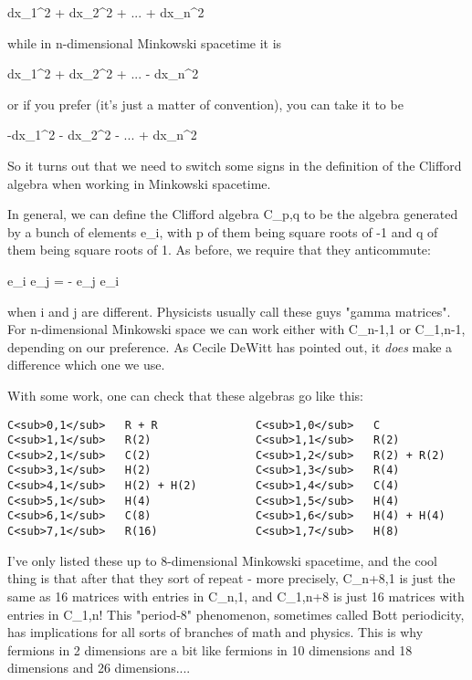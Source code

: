                         dx_{1}^{2} + dx_{2}^{2} + ... + dx_{n}^{2}  

while in n-dimensional Minkowski spacetime it is

                        dx_{1}^{2} + dx_{2}^{2} 
+ ... - dx_{n}^{2}   
 
or if you prefer (it's just a matter of convention), you can
take it to be

                       -dx_{1}^{2} - dx_{2}^{2} 
- ... + dx_{n}^{2}   


So it turns out that we need to switch some signs in the definition 
of the Clifford algebra when working in Minkowski spacetime.  

In general, we can define the Clifford algebra C_{p,q} to be the 
algebra generated by a bunch of elements e_{i}, with p of them 
being square roots 
of -1 and q of them being square roots of 1.  As before, we require that 
they anticommute:

e_{i} e_{j} = - e_{j} e_{i}

when i and j are different.  Physicists usually call these guys "gamma
matrices".  For n-dimensional Minkowski space we can work either
with C_{n-1,1} or C_{1,n-1}, depending on our preference.  
As Cecile DeWitt has pointed out, it \emph{does} 
make a difference which one we 
use.  

With some work, one can check that these algebras go like this:

\begin{verbatim}
C<sub>0,1</sub>   R + R               C<sub>1,0</sub>   C
C<sub>1,1</sub>   R(2)                C<sub>1,1</sub>   R(2)
C<sub>2,1</sub>   C(2)                C<sub>1,2</sub>   R(2) + R(2)
C<sub>3,1</sub>   H(2)                C<sub>1,3</sub>   R(4)
C<sub>4,1</sub>   H(2) + H(2)         C<sub>1,4</sub>   C(4)
C<sub>5,1</sub>   H(4)                C<sub>1,5</sub>   H(4)
C<sub>6,1</sub>   C(8)                C<sub>1,6</sub>   H(4) + H(4) 
C<sub>7,1</sub>   R(16)               C<sub>1,7</sub>   H(8)

\end{verbatim}
    
I've only listed these up to 8-dimensional Minkowski spacetime, and
the cool thing is that after that they sort of repeat - more precisely,
C_{n+8,1} is just the same as 16  matrices with entries in 
C_{n,1},
and C_{1,n+8} is just 16  matrices with entries in 
C_{1,n}!  
This "period-8" phenomenon, sometimes called Bott periodicity, has 
implications for all sorts of branches of math and physics.  This is
why fermions in 2 dimensions are a bit like fermions in 10 dimensions
and 18 dimensions and 26 dimensions....

